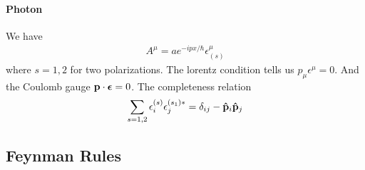 \documentclass[../main.tex]{subfiles}
\begin{document}
\paragraph*{Photon} 
We have
\begin{align*}
    A^\mu = a e^{-ip x/\hbar} \epsilon_{(s)}^\mu
\end{align*}
where $s = 1,2$ for two polarizations. The lorentz condition tells us $p_\mu \epsilon^\mu = 0$. And the
Coulomb gauge $\vb p \cdot \vb*\epsilon = 0$. The completeness relation
\begin{align*}
    \sum_{s = 1,2} \epsilon_i^{(s)} \epsilon_j^{(s_1)*} = \delta_{ij} - \vu p_i \vu p_j
\end{align*}

\newpage
{}
\subsection*{Feynman Rules}
\end{document}
